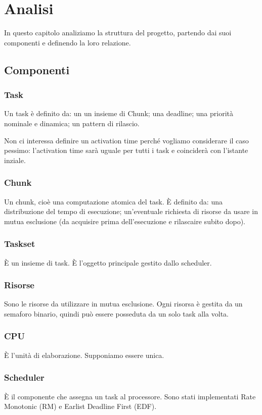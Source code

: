 \chapter{Analisi}
In questo capitolo analiziamo la struttura del progetto, partendo dai suoi componenti e definendo la loro relazione.

\section{Componenti}

\subsection{Task}
Un task è definito da: un un insieme di Chunk; una deadline; una priorità nominale e dinamica; un pattern di rilascio.

Non ci interessa definire un activation time perché vogliamo considerare il caso pessimo: l'activation time sarà uguale per tutti i task e coinciderà con l'istante inziale.

\subsection{Chunk}
Un chunk, cioè una computazione atomica del task. È definito da: una distribuzione del tempo di esecuzione; un'eventuale richiesta di risorse da usare in mutua esclusione (da acquisire prima dell'esecuzione e rilascaire subito dopo).

\subsection{Taskset}
È un insieme di task. È l'oggetto principale gestito dallo scheduler.

\subsection{Risorse}
Sono le risorse da utilizzare in mutua esclusione. Ogni risorsa è gestita da un semaforo binario, quindi può essere posseduta da un solo task alla volta.

\subsection{CPU}
È l'unità di elaborazione. Supponiamo essere unica.

\subsection{Scheduler}
È il componente che assegna un task al processore. Sono stati implementati Rate Monotonic (RM) e Earlist Deadline First (EDF).

